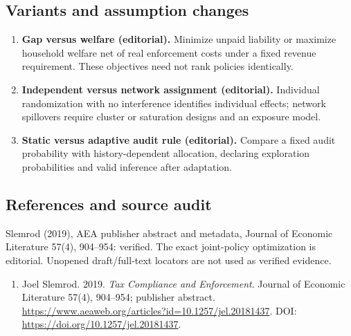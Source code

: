 \documentclass[11pt,a4paper]{article}
\begin{document}
\subsection*{Variants and assumption changes}
\begin{enumerate}
\item \textbf{Gap versus welfare (editorial).} Minimize unpaid liability or maximize household welfare net of real enforcement costs under a fixed revenue requirement. These objectives need not rank policies identically.
\item \textbf{Independent versus network assignment (editorial).} Individual randomization with no interference identifies individual effects; network spillovers require cluster or saturation designs and an exposure model.
\item \textbf{Static versus adaptive audit rule (editorial).} Compare a fixed audit probability with history-dependent allocation, declaring exploration probabilities and valid inference after adaptation.
\end{enumerate}
\subsection*{References and source audit}
Slemrod (2019), AEA publisher abstract and metadata, Journal of Economic Literature 57(4), 904--954: verified. The exact joint-policy optimization is editorial. Unopened draft/full-text locators are not used as verified evidence.
\begin{enumerate}\raggedright
\item\hypertarget{definitions:source:30007759:1}{} Joel Slemrod. 2019. \emph{Tax Compliance and Enforcement}. Journal of Economic Literature 57(4), 904–954; publisher abstract.
\url{https://www.aeaweb.org/articles?id=10.1257/jel.20181437}.
DOI: \url{https://doi.org/10.1257/jel.20181437}.
\end{enumerate}
\end{document}
